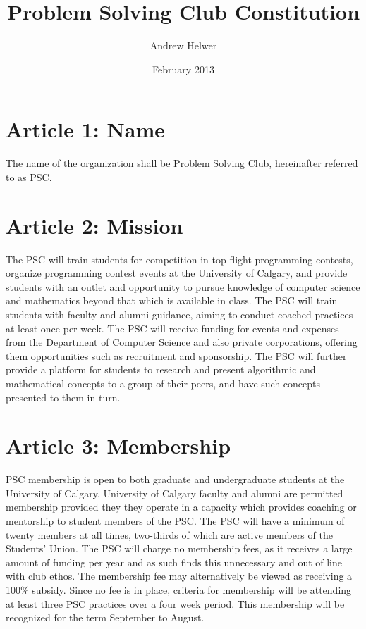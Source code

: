 \documentclass{article}
\begin{document}
\title{Problem Solving Club Constitution}
\author{Andrew Helwer}
\date{February 2013}
\maketitle

\section{Article 1: Name}

The name of the organization shall be Problem Solving Club, hereinafter referred to as PSC.

\section{Article 2: Mission}

The PSC will train students for competition in top-flight programming contests, organize programming contest events at the University of Calgary, and provide students with an outlet and opportunity to pursue knowledge of computer science and mathematics beyond that which is available in class.
The PSC will train students with faculty and alumni guidance, aiming to conduct coached practices at least once per week. 
The PSC will receive funding for events and expenses from the Department of Computer Science and also private corporations, offering them opportunities such as recruitment and sponsorship.
The PSC will further provide a platform for students to research and present algorithmic and mathematical concepts to a group of their peers, and have such concepts presented to them in turn.

\section{Article 3: Membership}

PSC membership is open to both graduate and undergraduate students at the University of Calgary.
University of Calgary faculty and alumni are permitted membership provided they they operate in a capacity which provides coaching or mentorship to student members of the PSC.
The PSC will have a minimum of twenty members at all times, two-thirds of which are active members of the Students' Union.
The PSC will charge no membership fees, as it receives a large amount of funding per year and as such finds this unnecessary and out of line with club ethos.
The membership fee may alternatively be viewed as receiving a 100\% subsidy.
Since no fee is in place, criteria for membership will be attending at least three PSC practices over a four week period.
This membership will be recognized for the term September to August.
\end{document}
